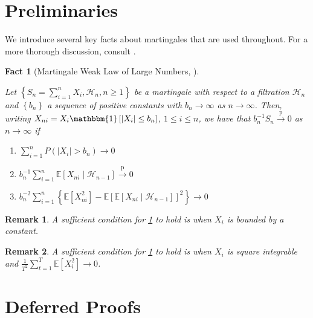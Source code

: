 \documentclass[11pt]{article}
\newcommand{\E}{\mathbb{E}}
\newtheorem{fact}{Fact}
\newtheorem{remark}{Remark}
\begin{document}
\begin{appendix}

\section{Preliminaries }
We introduce several key facts about martingales that are used throughout. For a more thorough discussion, consult \cite{hall2014martingale}.

\begin{fact}[Martingale Weak Law of Large Numbers, \cite{hall2014martingale}]  \label{fact:martingale_wlln}
 
Let $\left\{S_n=\sum_{i=1}^n X_i, \mathcal{H}_{n}, n \geq 1\right\}$ be a martingale with respect to a filtration $\mathcal{H}_{n}$ and $\left\{b_n\right\}$ a sequence of positive constants with $b_n \rightarrow \infty$ as $n \rightarrow \infty$. Then, writing $X_{n i}=X_i \mathbbm{1}\left[\left|X_i\right| \leq b_n\right]$, $1 \leq i \leq n$, we have that $b_n^{-1} S_n \xrightarrow{\mathrm{p}} 0$ as $n \rightarrow \infty$ if
\begin{enumerate}
    \item $\sum_{i=1}^n P\left(\left|X_i\right|>b_n\right) \rightarrow 0$
    \item $b_n^{-1} \sum_{i=1}^n \mathbb{E}\left[X_{n i} \mid \mathcal{H}_{n-1}\right] \xrightarrow{\mathrm{p}} 0$
    \item $b_n^{-2} \sum_{i=1}^n\left\{\mathbb{E}\left[X_{n i}^2\right]-\mathbb{E}\left[\mathbb{E}\left[X_{n i} \mid \mathcal{H}_{n-1}\right]\right]^2\right\} \rightarrow 0$
\end{enumerate}
\end{fact}

\begin{remark} A sufficient condition for \cref{fact:martingale_wlln} to hold is when $X_i$ is bounded by a constant.
\end{remark}

\begin{remark} \label{remark:wlln_integrable} A sufficient condition for \cref{fact:martingale_wlln} to hold is when $X_{i}$ is square integrable and $\frac{1}{T^{2}} \sum_{t=1}^{T} \E[X_{i}^{2}] \rightarrow 0$.
\end{remark}



\section{Deferred Proofs}


\end{appendix}
\end{document}
